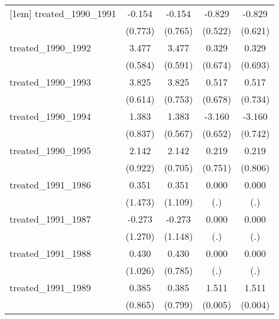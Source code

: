 {\begin{tabular}{l*{4}{c}}
[1em]
treated\_1990\_1991&      -0.154         &      -0.154         &      -0.829         &      -0.829         \\
            &     (0.773)         &     (0.765)         &     (0.522)         &     (0.621)         \\
[1em]
treated\_1990\_1992&       3.477\sym{***}&       3.477\sym{***}&       0.329         &       0.329         \\
            &     (0.584)         &     (0.591)         &     (0.674)         &     (0.693)         \\
[1em]
treated\_1990\_1993&       3.825\sym{***}&       3.825\sym{***}&       0.517         &       0.517         \\
            &     (0.614)         &     (0.753)         &     (0.678)         &     (0.734)         \\
[1em]
treated\_1990\_1994&       1.383         &       1.383\sym{*}  &      -3.160\sym{***}&      -3.160\sym{***}\\
            &     (0.837)         &     (0.567)         &     (0.652)         &     (0.742)         \\
[1em]
treated\_1990\_1995&       2.142\sym{*}  &       2.142\sym{**} &       0.219         &       0.219         \\
            &     (0.922)         &     (0.705)         &     (0.751)         &     (0.806)         \\
[1em]
treated\_1991\_1986&       0.351         &       0.351         &       0.000         &       0.000         \\
            &     (1.473)         &     (1.109)         &         (.)         &         (.)         \\
[1em]
treated\_1991\_1987&      -0.273         &      -0.273         &       0.000         &       0.000         \\
            &     (1.270)         &     (1.148)         &         (.)         &         (.)         \\
[1em]
treated\_1991\_1988&       0.430         &       0.430         &       0.000         &       0.000         \\
            &     (1.026)         &     (0.785)         &         (.)         &         (.)         \\
[1em]
treated\_1991\_1989&       0.385         &       0.385         &       1.511\sym{***}&       1.511\sym{***}\\
            &     (0.865)         &     (0.799)         &     (0.005)         &     (0.004)         \\

\end{tabular}}
